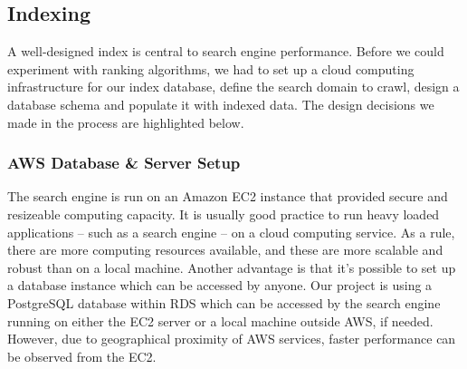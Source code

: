 \begin{table}[H]
\centering
\caption{Composition of test datasets}
\label{dataset-table}
\end{table}


\subsection{Indexing} %
\label{sub:methods}
A well-designed index is central to search engine performance. Before we could experiment with ranking algorithms, we had to set up a cloud computing infrastructure for our index database, define the search domain to crawl, design a database schema and populate it with indexed data. The design decisions we made in the process are highlighted below. %

\subsubsection{AWS Database \& Server Setup} %
\label{ssub:database_and_server_setup}

The search engine is run on an Amazon EC2 instance that provided secure and resizeable computing capacity. It is usually good practice to run heavy loaded applications -- such as a search engine -- on a cloud computing service. As a rule, there are more computing resources available, and these are more scalable and robust than on a local machine. Another advantage is that it's possible to set up a database instance which can be accessed by anyone. Our project is using a PostgreSQL database within RDS which can be accessed by the search engine running on either the EC2 server or a local machine outside AWS, if needed. However, due to geographical proximity of AWS services, faster performance can be observed from the EC2.

